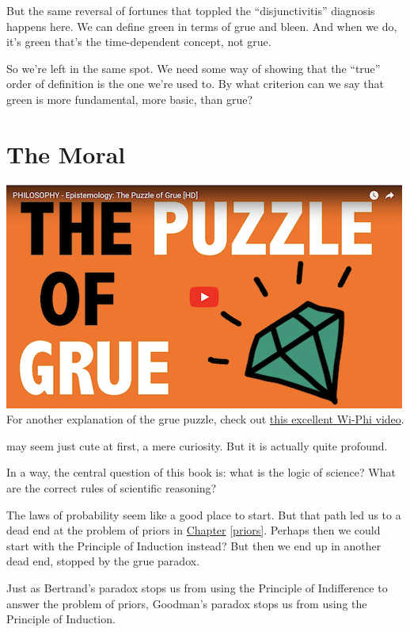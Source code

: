 \documentclass[justified]{tufte-book}
\begin{document}
But the same reversal of fortunes that toppled the ``disjunctivitis'' diagnosis happens here. We can define green in terms of grue and bleen. And when we do, it's green that's the time-dependent concept, not grue.

So we're left in the same spot. We need some way of showing that the ``true'' order of definition is the one we're used to. By what criterion can we say that green is more fundamental, more basic, than grue?

\hypertarget{the-moral}{%
\section*{The Moral}\label{the-moral}}

\begin{marginfigure}
\href{http://www.wi-phi.com/video/puzzle-grue}{\includegraphics{img/wiphi_grue.png}}
For another explanation of the grue puzzle, check out
\href{http://www.wi-phi.com/video/puzzle-grue}{this excellent Wi-Phi
video}.
\end{marginfigure}

 may seem just cute at first, a mere curiosity. But it is actually quite profound.

In a way, the central question of this book is: what is the logic of science? What are the correct rules of scientific reasoning?

The laws of probability seem like a good place to start. But that path led us to a dead end at the problem of priors in \protect\hyperlink{priors}{Chapter} \ref{priors}. Perhaps then we could start with the Principle of Induction instead? But then we end up in another dead end, stopped by the grue paradox.

Just as Bertrand's paradox stops us from using the Principle of Indifference to answer the problem of priors, Goodman's paradox stops us from using the Principle of Induction.
\end{document}
